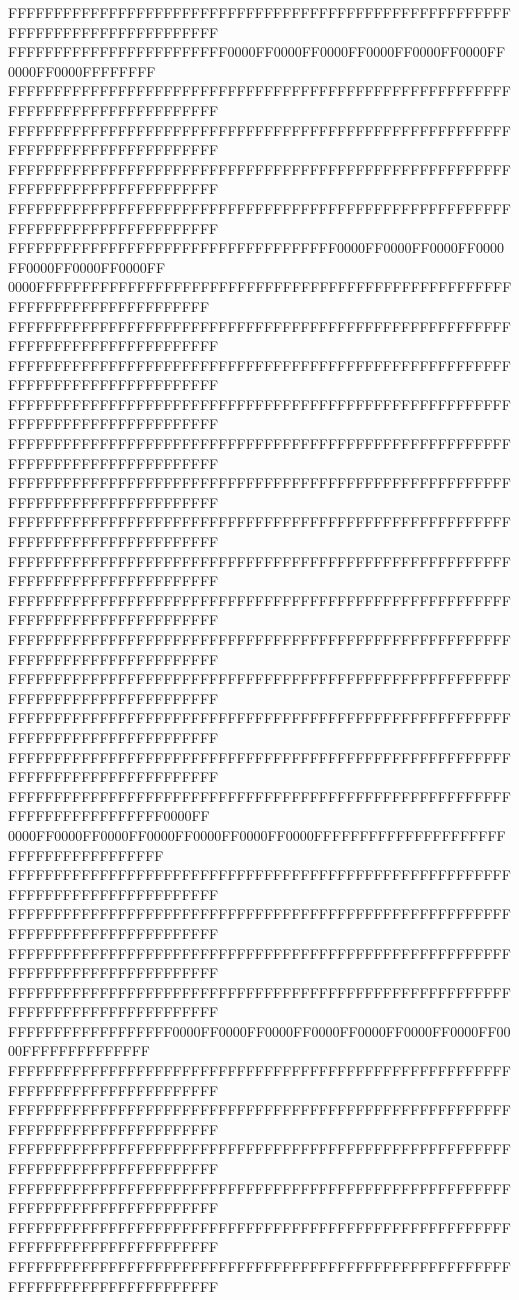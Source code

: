 FFFFFFFFFFFFFFFFFFFFFFFFFFFFFFFFFFFFFFFFFFFFFFFFFFFFFFFFFFFFFFFFFFFFFFFFFFFFFF
FFFFFFFFFFFFFFFFFFFFFFFF0000FF0000FF0000FF0000FF0000FF0000FF0000FF0000FFFFFFFF
FFFFFFFFFFFFFFFFFFFFFFFFFFFFFFFFFFFFFFFFFFFFFFFFFFFFFFFFFFFFFFFFFFFFFFFFFFFFFF
FFFFFFFFFFFFFFFFFFFFFFFFFFFFFFFFFFFFFFFFFFFFFFFFFFFFFFFFFFFFFFFFFFFFFFFFFFFFFF
FFFFFFFFFFFFFFFFFFFFFFFFFFFFFFFFFFFFFFFFFFFFFFFFFFFFFFFFFFFFFFFFFFFFFFFFFFFFFF
FFFFFFFFFFFFFFFFFFFFFFFFFFFFFFFFFFFFFFFFFFFFFFFFFFFFFFFFFFFFFFFFFFFFFFFFFFFFFF
FFFFFFFFFFFFFFFFFFFFFFFFFFFFFFFFFFFF0000FF0000FF0000FF0000FF0000FF0000FF0000FF
0000FFFFFFFFFFFFFFFFFFFFFFFFFFFFFFFFFFFFFFFFFFFFFFFFFFFFFFFFFFFFFFFFFFFFFFFFFF
FFFFFFFFFFFFFFFFFFFFFFFFFFFFFFFFFFFFFFFFFFFFFFFFFFFFFFFFFFFFFFFFFFFFFFFFFFFFFF
FFFFFFFFFFFFFFFFFFFFFFFFFFFFFFFFFFFFFFFFFFFFFFFFFFFFFFFFFFFFFFFFFFFFFFFFFFFFFF
FFFFFFFFFFFFFFFFFFFFFFFFFFFFFFFFFFFFFFFFFFFFFFFFFFFFFFFFFFFFFFFFFFFFFFFFFFFFFF
FFFFFFFFFFFFFFFFFFFFFFFFFFFFFFFFFFFFFFFFFFFFFFFFFFFFFFFFFFFFFFFFFFFFFFFFFFFFFF
FFFFFFFFFFFFFFFFFFFFFFFFFFFFFFFFFFFFFFFFFFFFFFFFFFFFFFFFFFFFFFFFFFFFFFFFFFFFFF
FFFFFFFFFFFFFFFFFFFFFFFFFFFFFFFFFFFFFFFFFFFFFFFFFFFFFFFFFFFFFFFFFFFFFFFFFFFFFF
FFFFFFFFFFFFFFFFFFFFFFFFFFFFFFFFFFFFFFFFFFFFFFFFFFFFFFFFFFFFFFFFFFFFFFFFFFFFFF
FFFFFFFFFFFFFFFFFFFFFFFFFFFFFFFFFFFFFFFFFFFFFFFFFFFFFFFFFFFFFFFFFFFFFFFFFFFFFF
FFFFFFFFFFFFFFFFFFFFFFFFFFFFFFFFFFFFFFFFFFFFFFFFFFFFFFFFFFFFFFFFFFFFFFFFFFFFFF
FFFFFFFFFFFFFFFFFFFFFFFFFFFFFFFFFFFFFFFFFFFFFFFFFFFFFFFFFFFFFFFFFFFFFFFFFFFFFF
FFFFFFFFFFFFFFFFFFFFFFFFFFFFFFFFFFFFFFFFFFFFFFFFFFFFFFFFFFFFFFFFFFFFFFFFFFFFFF
FFFFFFFFFFFFFFFFFFFFFFFFFFFFFFFFFFFFFFFFFFFFFFFFFFFFFFFFFFFFFFFFFFFFFFFFFFFFFF
FFFFFFFFFFFFFFFFFFFFFFFFFFFFFFFFFFFFFFFFFFFFFFFFFFFFFFFFFFFFFFFFFFFFFFFF0000FF
0000FF0000FF0000FF0000FF0000FF0000FF0000FFFFFFFFFFFFFFFFFFFFFFFFFFFFFFFFFFFFFF
FFFFFFFFFFFFFFFFFFFFFFFFFFFFFFFFFFFFFFFFFFFFFFFFFFFFFFFFFFFFFFFFFFFFFFFFFFFFFF
FFFFFFFFFFFFFFFFFFFFFFFFFFFFFFFFFFFFFFFFFFFFFFFFFFFFFFFFFFFFFFFFFFFFFFFFFFFFFF
FFFFFFFFFFFFFFFFFFFFFFFFFFFFFFFFFFFFFFFFFFFFFFFFFFFFFFFFFFFFFFFFFFFFFFFFFFFFFF
FFFFFFFFFFFFFFFFFFFFFFFFFFFFFFFFFFFFFFFFFFFFFFFFFFFFFFFFFFFFFFFFFFFFFFFFFFFFFF
FFFFFFFFFFFFFFFFFF0000FF0000FF0000FF0000FF0000FF0000FF0000FF0000FFFFFFFFFFFFFF
FFFFFFFFFFFFFFFFFFFFFFFFFFFFFFFFFFFFFFFFFFFFFFFFFFFFFFFFFFFFFFFFFFFFFFFFFFFFFF
FFFFFFFFFFFFFFFFFFFFFFFFFFFFFFFFFFFFFFFFFFFFFFFFFFFFFFFFFFFFFFFFFFFFFFFFFFFFFF
FFFFFFFFFFFFFFFFFFFFFFFFFFFFFFFFFFFFFFFFFFFFFFFFFFFFFFFFFFFFFFFFFFFFFFFFFFFFFF
FFFFFFFFFFFFFFFFFFFFFFFFFFFFFFFFFFFFFFFFFFFFFFFFFFFFFFFFFFFFFFFFFFFFFFFFFFFFFF
FFFFFFFFFFFFFFFFFFFFFFFFFFFFFFFFFFFFFFFFFFFFFFFFFFFFFFFFFFFFFFFFFFFFFFFFFFFFFF
FFFFFFFFFFFFFFFFFFFFFFFFFFFFFFFFFFFFFFFFFFFFFFFFFFFFFFFFFFFFFFFFFFFFFFFFFFFFFF

